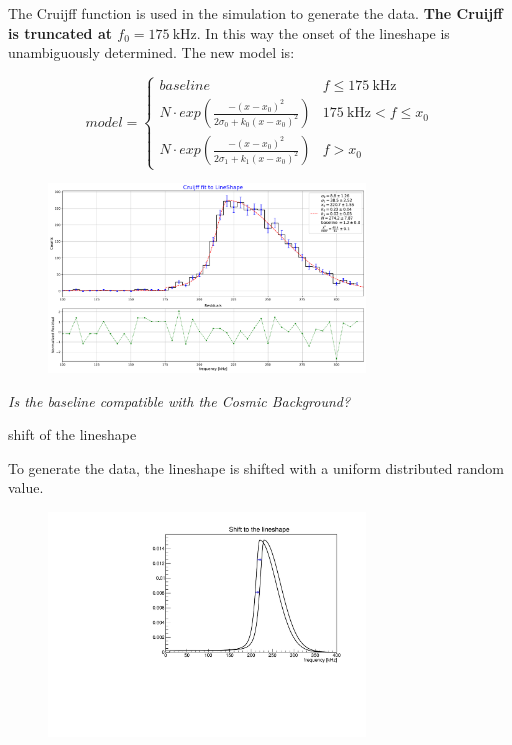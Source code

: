 \documentclass[8pt]{beamer}
\newcommand{\nologo}{\setbeamertemplate{logo}{}}
\begin{document}
\begin{frame}

The Cruijff function is used in the simulation to generate the data. \textbf{The Cruijff is truncated at $f_{0} = \SI{175}{\kilo \hertz}$}. In this way the onset of the lineshape is unambiguously determined. The new model is:

\begin{equation}
model =
\begin{cases}
baseline 	& f \leqslant \SI{175}{\kilo \hertz} \\
N \cdot exp(  \frac{-(x - x_{0})^2}{2\sigma_{0} + k_{0}(x - x_{0})^{2}}) & \SI{175}{\kilo \hertz} < f \leqslant x_{0} \\
N \cdot exp(  \frac{-(x - x_{0})^2}{2\sigma_{1} + k_{1}(x - x_{0})^{2}}) &  f >  x_{0}
\end{cases}
\end{equation}

\begin{figure}[hbtp]
\centering
\includegraphics[width = 0.75\textwidth]{../Plot/TruncatedLineShape.pdf}
\end{figure}

\textit{Is the baseline compatible with the Cosmic Background?}
\end{frame}

{\nologo
\begin{frame}{shift of the lineshape}

To generate the data, the lineshape is shifted with a uniform distributed random value.

\begin{figure}[hbtp]
\centering
\includegraphics[width = 0.75\textwidth]{ShiftedLineshape.pdf}
\end{figure}

\end{frame}
}
\end{document}

